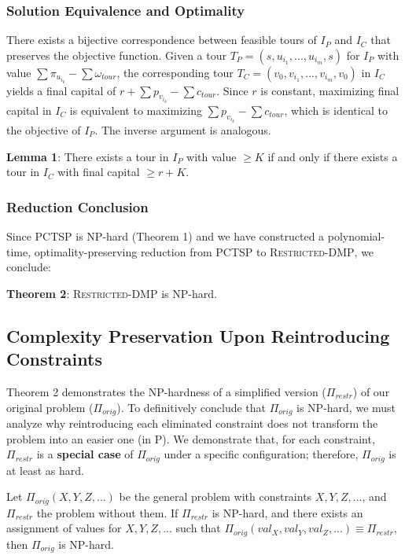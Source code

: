 \documentclass{article} \usepackage[english]{babel} \usepackage[utf8]{inputenc}
\begin{document}
\subsubsection*{Solution Equivalence and Optimality} There exists a bijective
correspondence between feasible tours of $I_P$ and $I_C$ that preserves the
objective function. Given a tour $T_P = (s, u_{i_1}, ..., u_{i_m}, s)$ for $I_P$
with value $\sum \pi_{u_{i_k}} - \sum \omega_{tour}$, the corresponding tour
$T_C = (v_0, v_{i_1}, ..., v_{i_m}, v_0)$ in $I_C$ yields a final capital of $r
+ \sum p_{v_{i_k}} - \sum c_{tour}$. Since $r$ is constant, maximizing final
capital in $I_C$ is equivalent to maximizing $\sum p_{v_{i_k}} - \sum c_{tour}$,
which is identical to the objective of $I_P$. The inverse argument is analogous.

\textbf{Lemma 1}: There exists a tour in $I_P$ with value $\geq K$ if and only
if there exists a tour in $I_C$ with final capital $\geq r + K$.

\subsubsection*{Reduction Conclusion} Since PCTSP is NP-hard (Theorem 1) and we
have constructed a polynomial-time, optimality-preserving reduction from PCTSP
to \textsc{Restricted-DMP}, we conclude:

\textbf{Theorem 2}: \textsc{Restricted-DMP} is NP-hard.

\subsection{Complexity Preservation Upon Reintroducing Constraints}
\label{subsec:complexity_preservation}

Theorem 2 demonstrates the NP-hardness of a simplified version ($\Pi_{restr}$)
of our original problem ($\Pi_{orig}$). To definitively conclude that
$\Pi_{orig}$ is NP-hard, we must analyze why reintroducing each eliminated
constraint does not transform the problem into an easier one (in P). We
demonstrate that, for each constraint, $\Pi_{restr}$ is a \textbf{special case}
of $\Pi_{orig}$ under a specific configuration; therefore, $\Pi_{orig}$ is at
least as hard.

Let $\Pi_{orig}(X, Y, Z, ...)$ be the general problem with constraints $X, Y, Z,
...$, and $\Pi_{restr}$ the problem without them. If $\Pi_{restr}$ is NP-hard,
and there exists an assignment of values for $X, Y, Z, ...$ such that
$\Pi_{orig}(val_X, val_Y, val_Z, ...) \equiv \Pi_{restr}$, then $\Pi_{orig}$ is
NP-hard.
\end{document}
